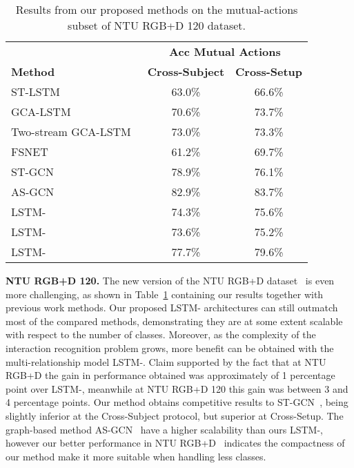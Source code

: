 \documentclass[journal,twoside]{IEEEtran}
\renewcommand{\arraystretch}{1.2}
\begin{document}
\begin{table}[ht]
	\begin{center}
	\setlength{\tabcolsep}{1em}
	\renewcommand{\arraystretch}{1.4} \caption{Results from our proposed methods on the mutual-actions subset of NTU RGB+D 120 dataset.}
	\begin{tabular}{lcc} 		\toprule
		& \multicolumn{2}{c}{\textbf{Acc Mutual Actions}} \\
		\textbf{Method} & \textbf{Cross-Subject} & \textbf{Cross-Setup} \\ \midrule
		ST-LSTM~\cite{Liu2016a}    			& 63.0\% & 66.6\% \\ 
		GCA-LSTM~\cite{Liu2017c}   			& 70.6\% & 73.7\% \\ 
		Two-stream GCA-LSTM~\cite{Liu2018}  & 73.0\% & 73.3\% \\
		FSNET~\cite{Liu2019c}      			& 61.2\% & 69.7\% \\
		ST-GCN~\cite{Yan2018a}	        	& 78.9\% & 76.1\% \\
		AS-GCN~\cite{Li2019}		    	& 82.9\% & 83.7\% \\
		\midrule
		LSTM-          & 74.3\% & 75.6\% \\ 
		LSTM-          & 73.6\% & 75.2\% \\ 
		LSTM- & 77.7\% & 79.6\% \\ \bottomrule
	\end{tabular}
	\label{tab:ntu_v2_inter}
	\end{center}
\end{table}

\textbf{NTU RGB+D 120.}\quad 
The new version of the NTU RGB+D dataset~\cite{Liu2019} is even more challenging, as shown in Table~\ref{tab:ntu_v2_inter} containing our results together with previous work methods.
Our proposed LSTM- architectures can still outmatch most of the compared methods, demonstrating they are at some extent scalable with respect to the number of classes.
Moreover, as the complexity of the interaction recognition problem grows, more benefit can be obtained with the multi-relationship model LSTM-.
Claim supported by the fact that at NTU RGB+D the gain in performance obtained was approximately of 1 percentage point over LSTM-, meanwhile at NTU RGB+D 120 this gain was between 3 and 4 percentage points.
Our method obtains competitive results to ST-GCN~\cite{Yan2018a}, being slightly inferior at the Cross-Subject protocol, but superior at Cross-Setup.
The graph-based method AS-GCN~\cite{Li2019} have a higher scalability than ours LSTM-, however our better performance in NTU RGB+D~\cite{Shahroudy2016} indicates the compactness of our method make it more suitable when handling less classes.
\end{document}
